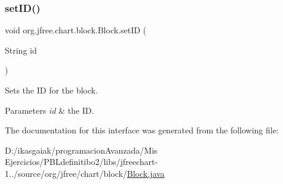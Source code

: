 \subsubsection{\texorpdfstring{set\+I\+D()}{setID()}}
{\footnotesize\ttfamily void org.\+jfree.\+chart.\+block.\+Block.\+set\+ID (\begin{DoxyParamCaption}\item[{String}]{id }\end{DoxyParamCaption})}

Sets the ID for the block.


\begin{DoxyParams}{Parameters}
{\em id} & the ID. \\
\hline
\end{DoxyParams}


The documentation for this interface was generated from the following file\+:\begin{DoxyCompactItemize}
\item 
D\+:/ikasgaiak/programacion\+Avanzada/\+Mis Ejercicios/\+P\+B\+Ldefinitibo2/libs/jfreechart-\/1../source/org/jfree/chart/block/\mbox{\hyperlink{_block_8java}{Block.\+java}}\end{DoxyCompactItemize}
